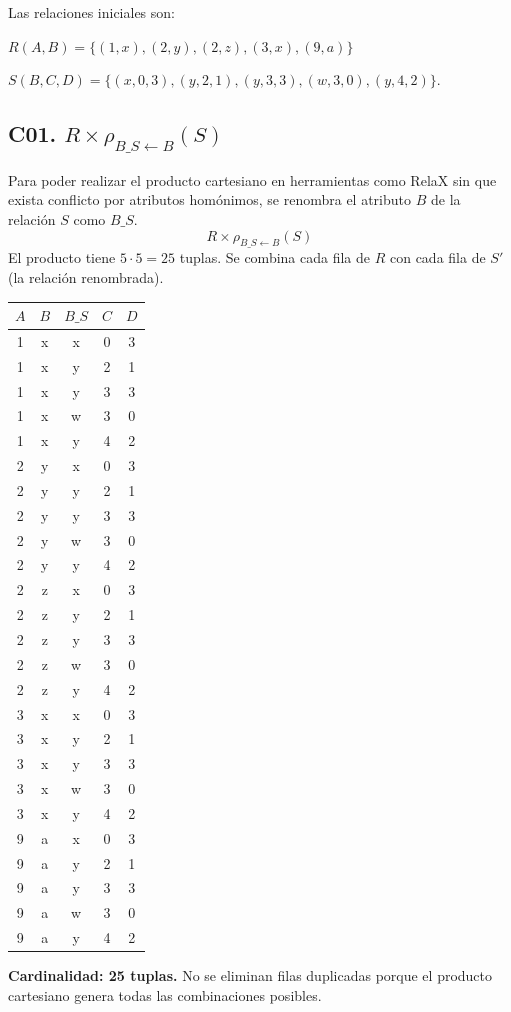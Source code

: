 Las relaciones iniciales son:\par 
$R(A,B)=\{(1,x),(2,y),(2,z),(3,x),(9,a)\}$\par 
$S(B,C,D)=\{(x,0,3),(y,2,1),(y,3,3),(w,3,0),(y,4,2)\}$.

\subsection*{C01. $R \times \rho_{B\_S \leftarrow B}(S)$}
Para poder realizar el producto cartesiano en herramientas como RelaX sin que exista conflicto por atributos homónimos, se renombra el atributo $B$ de la relación $S$ como $B\_S$. 
\[R \times \rho_{B\_S \leftarrow B}(S)\]
El producto tiene $5\cdot5=25$ tuplas. Se combina cada fila de $R$ con cada fila de $S'$ (la relación renombrada).
\begin{center}\begin{tabular}{ccccc}\toprule\rowcolor{Fondo} $A$ & $B$ & $B\_S$ & $C$ & $D$\\\midrule
1 & x & x & 0 & 3\\
1 & x & y & 2 & 1\\
1 & x & y & 3 & 3\\
1 & x & w & 3 & 0\\
1 & x & y & 4 & 2\\
2 & y & x & 0 & 3\\
2 & y & y & 2 & 1\\
2 & y & y & 3 & 3\\
2 & y & w & 3 & 0\\
2 & y & y & 4 & 2\\
2 & z & x & 0 & 3\\
2 & z & y & 2 & 1\\
2 & z & y & 3 & 3\\
2 & z & w & 3 & 0\\
2 & z & y & 4 & 2\\
3 & x & x & 0 & 3\\
3 & x & y & 2 & 1\\
3 & x & y & 3 & 3\\
3 & x & w & 3 & 0\\
3 & x & y & 4 & 2\\
9 & a & x & 0 & 3\\
9 & a & y & 2 & 1\\
9 & a & y & 3 & 3\\
9 & a & w & 3 & 0\\
9 & a & y & 4 & 2\\\bottomrule\end{tabular}\end{center}
\textbf{Cardinalidad: 25 tuplas.} No se eliminan filas duplicadas porque el producto cartesiano genera todas las combinaciones posibles.

